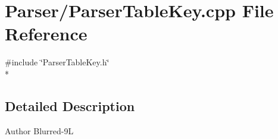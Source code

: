 \section{Parser/\-Parser\-Table\-Key.cpp File Reference}
\label{_parser_table_key_8cpp}
{\ttfamily \#include \char`\"{}Parser\-Table\-Key.\-h\char`\"{}}\\*


\subsection{Detailed Description}
\begin{DoxyAuthor}{Author}
Blurred-\/9\-L 
\end{DoxyAuthor}
